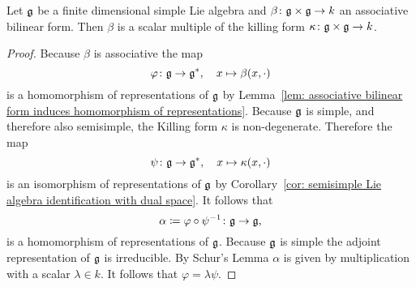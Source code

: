 \begin{cor}
 Let $\mathfrak{g}$ be a finite dimensional simple Lie algebra and $\beta \colon \mathfrak{g} \times \mathfrak{g} \to k$ an associative bilinear form. Then $\beta$ is a scalar multiple of the killing form $\kappa \colon \mathfrak{g} \times \mathfrak{g} \to k$.
\end{cor}
\begin{proof}
 Because $\beta$ is associative the map
 \[
  \varphi \colon \mathfrak{g} \to \mathfrak{g}^*, \quad x \mapsto \beta(x, \cdot)
 \]
 is a homomorphism of representations of $\mathfrak{g}$ by Lemma~\ref{lem: associative bilinear form induces homomorphism of representations}. Because $\mathfrak{g}$ is simple, and therefore also semisimple, the Killing form $\kappa$ is non-degenerate. Therefore the map
 \[
  \psi \colon \mathfrak{g} \to \mathfrak{g}^*, \quad x \mapsto \kappa(x, \cdot)
 \]
 is an isomorphism of representations of $\mathfrak{g}$ by Corollary~\ref{cor: semisimple Lie algebra identification with dual space}. It follows that
 \[
  \alpha \coloneqq \varphi \circ \psi^{-1} \colon \mathfrak{g} \to \mathfrak{g}, 
 \]
 is a homomorphism of representations of $\mathfrak{g}$. Because $\mathfrak{g}$ is simple the adjoint representation of $\mathfrak{g}$ is irreducible. By Schur’s Lemma $\alpha$ is given by multiplication with a scalar $\lambda \in k$. It follows that $\varphi = \lambda \psi$.
\end{proof}














